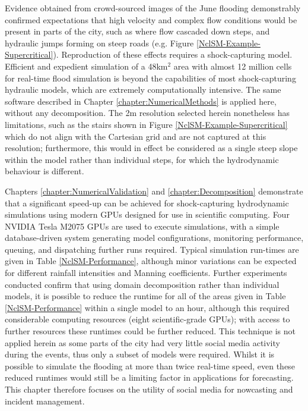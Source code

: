 Evidence obtained from crowd-sourced images of the June flooding demonstrably confirmed expectations that high velocity and complex flow conditions would be present in parts of the city, such as where flow cascaded down steps, and hydraulic jumps forming on steep roads (e.g. Figure \ref{NclSM-Example-Supercritical}). Reproduction of these effects requires a shock-capturing model. Efficient and expedient simulation of a 48km$^2$ area with almost 12 million cells for real-time flood simulation is beyond the capabilities of most shock-capturing hydraulic models, which are extremely computationally intensive. The same software described in Chapter \ref{chapter:NumericalMethods} is applied here, without any decomposition. The 2m resolution selected herein nonetheless has limitations, such as the stairs shown in Figure \ref{NclSM-Example-Supercritical} which do not align with the Cartesian grid and are not captured at this resolution; furthermore, this would in effect be considered as a single steep slope within the model rather than individual steps, for which the hydrodynamic behaviour is different.

Chapters \ref{chapter:NumericalValidation} and \ref{chapter:Decomposition} demonstrate that a significant speed-up can be achieved for shock-capturing hydrodynamic simulations using modern GPUs designed for use in scientific computing. Four NVIDIA Tesla M2075 GPUs are used to execute simulations, with a simple database-driven system generating model configurations, monitoring performance, queuing, and dispatching further runs required. Typical simulation run-times are given in Table \ref{NclSM-Performance}, although minor variations can be expected for different rainfall intensities and Manning coefficients. Further experiments conducted confirm that using domain decomposition rather than individual models, it is possible to reduce the runtime for all of the areas given in Table \ref{NclSM-Performance} within a single model to an hour, although this required considerable computing resources (eight scientific-grade GPUs); with access to further resources these runtimes could be further reduced. This technique is not applied herein as some parts of the city had very little social media activity during the events, thus only a subset of models were required. Whilst it is possible to simulate the flooding at more than twice real-time speed, even these reduced runtimes would still be a limiting factor in applications for forecasting. This chapter therefore focuses on the utility of social media for nowcasting and incident management.

